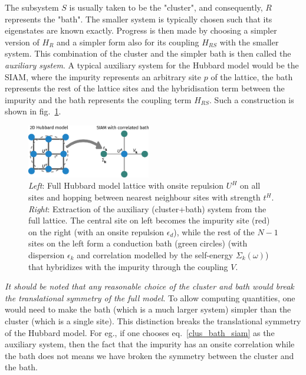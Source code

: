 \documentclass[reprint,hidelinks]{revtex4-2}
\begin{document}
The subsystem \(S\) is usually taken to be the "cluster", and consequently, \(R\) represents the "bath".
The smaller system is typically chosen such that its eigenstates are known exactly.
Progress is then made by choosing a simpler version of \(H_R\) and a simpler form also for its coupling \(H_{RS}\) with the smaller system.
This combination of the cluster and the simpler bath is then called the \textit{auxiliary system}.
A typical auxiliary system for the Hubbard model would be the SIAM, where the impurity represents an arbitrary site \(p\) of the lattice, the bath represents the rest of the lattice sites and the hybridisation term between the impurity and the bath represents the coupling term \(H_{RS}\).
Such a construction is shown in fig.~\ref{cluster-bath}.
\begin{figure}[!htb]
	\centering
	\includegraphics[width=0.48\textwidth]{clusterBath.pdf}
	\caption{\textit{Left}: Full Hubbard model lattice with onsite repulsion $U^H$ on all sites and hopping between nearest neighbour sites with strength $t^H$. \textit{Right}: Extraction of the auxiliary (cluster+bath) system from the full lattice. The central site on left becomes the impurity site (red) on the right (with an onsite repulsion $\epsilon_d$), while the rest of the $N-1$ sites on the left form a conduction bath (green circles) (with dispersion $\epsilon_k$ and correlation modelled by the self-energy $\Sigma_k(\omega)$) that hybridizes with the impurity through the coupling $V$.}
	\label{cluster-bath}
\end{figure}
\textit{It should be noted that any reasonable choice of the cluster and bath would break the translational symmetry of the full model}. To allow computing quantities, one would need to make the bath (which is a much larger system) simpler than the cluster (which is a single site). This distinction breaks the translational symmetry of the Hubbard model. For eg., if one chooses eq.~\ref{clus_bath_siam} as the auxiliary system, then the fact that the impurity has an onsite correlation while the bath does not means we have broken the symmetry between the cluster and the bath.
\end{document}
